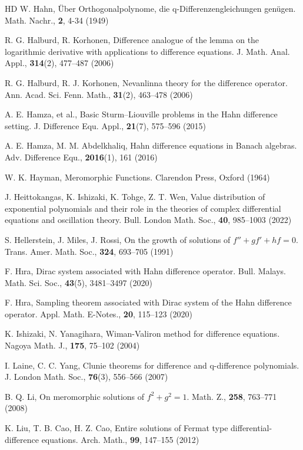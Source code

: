 \documentclass[sn-mathphys-num]{sn-jnl}%
\theoremstyle{thmstyleone}%
\theoremstyle{thmstyletwo}%
\theoremstyle{thmstylethree}%
\begin{document}
\begin{thebibliography}{HD}
 W. Hahn, \"{U}ber Orthogonalpolynome, die q-Differenzengleichungen gen\"{u}gen. Math. Nachr., \textbf{2}, 4-34 (1949)

 R. G. Halburd, R. Korhonen, Difference analogue of the lemma on the logarithmic derivative with applications to difference equations. J. Math. Anal. Appl., \textbf{314}(2), 477--487 (2006)

 R. G. Halburd, R. J. Korhonen, Nevanlinna theory for the difference operator. Ann. Acad. Sci. Fenn. Math., \textbf{31}(2), 463--478 (2006)

 A. E. Hamza, et al., Basic Sturm--Liouville problems in the Hahn difference setting. J. Difference Equ. Appl., \textbf{21}(7), 575--596 (2015)

 A. E. Hamza, M. M. Abdelkhaliq, Hahn difference equations in Banach algebras. Adv. Difference Equ., \textbf{2016}(1), 161 (2016)

 W. K. Hayman, Meromorphic Functions. Clarendon Press, Oxford (1964)

 J. Heittokangas, K. Ishizaki, K. Tohge, Z. T. Wen, Value distribution of exponential polynomials and their role in the theories of complex differential equations and oscillation theory. Bull. London Math. Soc., \textbf{40}, 985--1003 (2022)

 S. Hellerstein, J. Miles, J. Rossi, On the growth of solutions of $f''+gf'+hf=0$. Trans. Amer. Math. Soc., \textbf{324}, 693--705 (1991)

 F. H{\i}ra, Dirac system associated with Hahn difference operator. Bull. Malays. Math. Sci. Soc., \textbf{43}(5), 3481--3497 (2020)

 F. H{\i}ra, Sampling theorem associated with Dirac system of the Hahn difference operator. Appl. Math. E-Notes., \textbf{20}, 115--123 (2020)

 K. Ishizaki, N. Yanagihara, Wiman-Valiron method for difference equations. Nagoya Math. J., \textbf{175}, 75--102 (2004)

 I. Laine, C. C. Yang, Clunie theorems for difference and q-difference polynomials. J. London Math. Soc., \textbf{76}(3), 556--566 (2007)

 B. Q. Li, On meromorphic solutions of $f^2 + g^2 = 1$. Math. Z., \textbf{258}, 763--771 (2008)

 K. Liu, T. B. Cao, H. Z. Cao, Entire solutions of Fermat type differential-difference equations. Arch. Math., \textbf{99}, 147--155 (2012)


\end{thebibliography}
\end{document}
